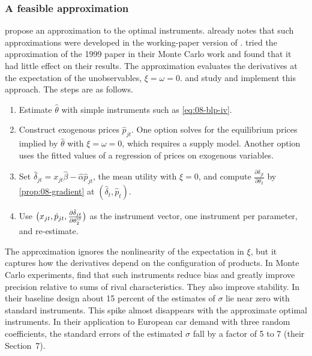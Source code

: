 \subsubsection{A feasible approximation}
\citet[Appendix, p.~429]{BerryLevinsohnPakes1999} propose an approximation to the optimal instruments. \citet[p.~258]{Berry1994}
already notes that such approximations were developed in the working-paper version of
\citet{BerryLevinsohnPakes1995}. \citet[Section~5.3.1, n.~17]{BerryPakes2007} tried the approximation of the
1999 paper in their Monte Carlo work and found that it had little effect on their results. The approximation
evaluates the derivatives at the expectation of the unobservables, $\xi = \omega = 0$.
\citet[Section~2.4]{ReynaertVerboven2014} and \citet[Section~4, Algorithm~2]{ConlonGortmaker2020} study and
implement this approach. The steps are as follows.
\begin{enumerate}[label=(\roman*)]
  \item Estimate $\hat\theta$ with simple instruments such as \eqref{eq:08-blp-iv}.
  \item Construct exogenous prices $\hat p_{jt}$. One option solves for the equilibrium prices implied by
  $\hat\theta$ with $\xi = \omega = 0$, which requires a supply model. Another option uses the fitted values of
  a regression of prices on exogenous variables.
  \item Set $\hat\delta_{jt} = x_{jt}\hat\beta - \hat\alpha\hat p_{jt}$, the mean utility with $\xi = 0$, and
  compute $\frac{\partial \delta_{jt}}{\partial \theta_2}$ by \cref{prop:08-gradient} at $(\hat\delta_t,
  \hat p_t)$.
  \item Use $\big(x_{jt}, \hat p_{jt}, \frac{\partial \hat\delta_{jt}}{\partial \theta_2^\T}\big)$ as the
  instrument vector, one instrument per parameter, and re-estimate.
\end{enumerate}
The approximation ignores the nonlinearity of the expectation in $\xi$, but it captures how the derivatives
depend on the configuration of products. In Monte Carlo experiments, \citet[Sections~4 and~5]{ReynaertVerboven2014}
find that such instruments reduce bias and greatly improve precision relative to sums of rival characteristics. They
also improve stability. In their baseline design about 15 percent of the estimates of $\sigma$ lie near zero with
standard instruments. This spike almost disappears with the approximate optimal instruments. In their
application to European car demand with three random coefficients, the standard errors of the estimated $\sigma$
fall by a factor of 5 to 7 (their Section~7).

